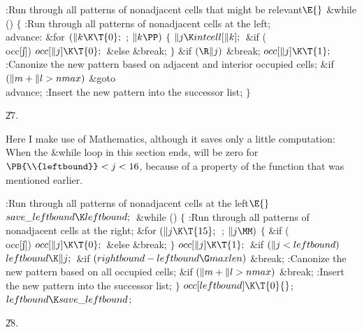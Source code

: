 \B{}:Run through all patterns of nonadjacent cells that
might be relevant\X${}\E{}$\6
\&{while} ()\5
${}\{{}$\1\6
:Run through all patterns of nonadjacent cells at the left\X;\6
\4\\{advance}:\5
\&{for} ${}(\|k\K\T{0};{}$  ; ${}\|k\PP){}$\5
${}\{{}$\1\6
${}\|j\K\\{intcell}[\|k];{}$\6
\&{if} (\\{occ}[\|j])\1\5
${}\\{occ}[\|j]\K\T{0};{}$\2\6
\&{else}\1\5
\&{break};\2\6
\4${}\}{}$\2\6
\&{if} ${}(\R\|j){}$\1\5
\&{break};\2\6
${}\\{occ}[\|j]\K\T{1};{}$\6
:Canonize the new pattern based on adjacent and interior occupied cells\X;\6
\&{if} ${}(\|m+\|l>\\{nmax}){}$\1\5
\&{goto} \\{advance};\2\6
:Insert the new pattern into the successor list\X;\6
\4${}\}{}$\2\par
\U27.\fi

Here I make use of Mathematics, although it saves only a
little
computation: When the \&{while} loop in this section ends,
 will be zero
for $\PB{\\{leftbound}}<j<16$, because of a property of the 
function that was mentioned earlier.

\Y\B\4:Run through all patterns of nonadjacent cells at the left\X${}\E{}$\6
$\\{save\_leftbound}\K\\{leftbound};{}$\6
\&{while} ()\5
${}\{{}$\1\6
:Run through all patterns of nonadjacent cells at the right\X;\6
\&{for} ${}(\|j\K\T{15};{}$  ; ${}\|j\MM){}$\5
${}\{{}$\1\6
\&{if} (\\{occ}[\|j])\1\5
${}\\{occ}[\|j]\K\T{0};{}$\2\6
\&{else}\1\5
\&{break};\2\6
\4${}\}{}$\2\6
${}\\{occ}[\|j]\K\T{1};{}$\6
\&{if} ${}(\|j<\\{leftbound}){}$\1\5
${}\\{leftbound}\K\|j;{}$\2\6
\&{if} ${}(\\{rightbound}-\\{leftbound}\G\\{maxlen}){}$\1\5
\&{break};\2\6
:Canonize the new pattern based on all occupied cells\X;\6
\&{if} ${}(\|m+\|l>\\{nmax}){}$\1\5
\&{break};\2\6
:Insert the new pattern into the successor list\X;\6
\4${}\}{}$\2\6
${}\\{occ}[\\{leftbound}]\K\T{0}{}$;\6
${}\\{leftbound}\K\\{save\_leftbound}{}$;\par
\U28.\fi

